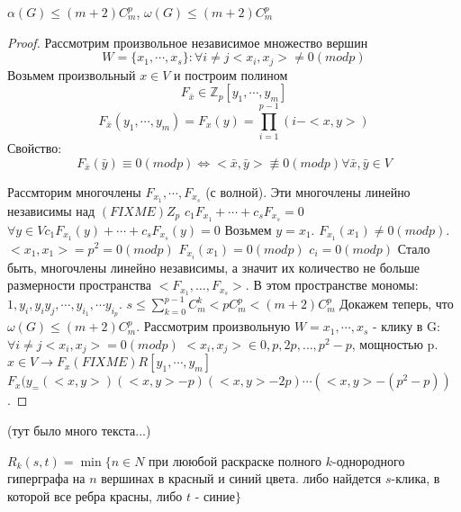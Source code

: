 \begin{lemma} $\alpha(G) \le (m+2)C_m^p$,
    $\omega(G) \le (m+2)C_m^p$

    \begin{proof}
        Рассмотрим произвольное независимое множество вершин 
        $$W = \{x_1, \cdots, x_s\}: \forall i \ne j <x_i, x_j> \ne 0 (mod p)$$
        Возьмем произвольный $x \in V$ и построим полином
        $$F_{\bar{x}} \in \mathbb{Z}_p[y_1, \cdots, y_m]$$
        $$F_{\bar{x}}(y_1,\cdots,y_m) = F_x(y) = \prod_{i=1}^{p-1}(i - <x,y>)$$
        Свойство:
        $$F_{\bar{x}}(\bar{y}) \equiv 0(mod p) \Leftrightarrow 
        <\bar{x},\bar{y}> \not \equiv 0 (mod p) \forall \bar{x}, \bar{y} \in V$$


        Рассмторим многочлены $F_{x_1}, \cdots, F_{x_s}$ (с волной). Эти многочлены линейно независимы над $(FIXME) Z_p$
        $c_1F_{x_1} + \cdots + c_sF_{x_s} = 0$
        $\forall y \in V c_1F_{x_1}(y) + \cdots + c_sF_{x_s}(y) = 0$
        Возьмем $y = x_1$. $F_{x_1}(x_1) \ne 0 (mod p)$. $<x_1, x_1> = p^2 = 0 (mod p)$
        $F_{x_i}(x_1) = 0(mod p)$
        $c_i = 0(mod p)$
        Стало быть, многочлены линейно независимы, а значит их количество не больше размерности пространства $<F_{x_1},\ldots,F_{x_s}>$.
        В этом пространстве мономы: $1, y_i, y_iy_j, \cdots, y_{i_1},\cdots y_{i_p}$.
        $s \le \sum_{k = 0}^{p - 1} C_m^k < pC_m^p < (m + 2)C_m^p$
        Докажем теперь, что $\omega(G) \le (m + 2)C_m^p$.
        Рассмотрим произвольную $W = {x_1, \cdots, x_s}$ - клику в G: $\forall i \ne j <x_i, x_j> = 0 (mod p)$
        $ < x_i, x_j> \in {0, p, 2p, \ldots, p^2 - p}$, мощностью p.
        $x \in V \rightarrow F_x (FIXME) R[y_1,\cdots,y_m]$
        $F_x(y_ = (<x,y>)(<x,y> - p)(<x,y> - 2p)\cdots(<x,y>-(p^2-p))$.
    \end{proof}
\end{lemma}

(тут было много текста...)

$R_k(s, t) = \min\{n \in N$ при лююбой раскраске полного $k$-однородного гиперграфа на $n$ вершинах в красный и синий цвета. 
либо найдется $s$-клика, в которой все ребра красны, либо $t$ - синие$\}$

